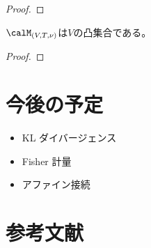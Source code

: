 \documentclass[report]{jlreq}
\begin{document}
\begin{proof}
    \TODO{}
\end{proof}

\begin{proposition}
    $\calM_{(V, T, \nu)}$は$V$の凸集合である。
\end{proposition}

\begin{proof}
    \TODO{}
\end{proof}


%
\section{今後の予定}

\begin{itemize}
    \item KL ダイバージェンス
    \item Fisher 計量
    \item アファイン接続
\end{itemize}

%
\section{参考文献}

\nocite{amari_information_2016}
\nocite{bn1970_pdf}

{
    \renewcommand{\bibsection}{}
    
    
}
\end{document}
